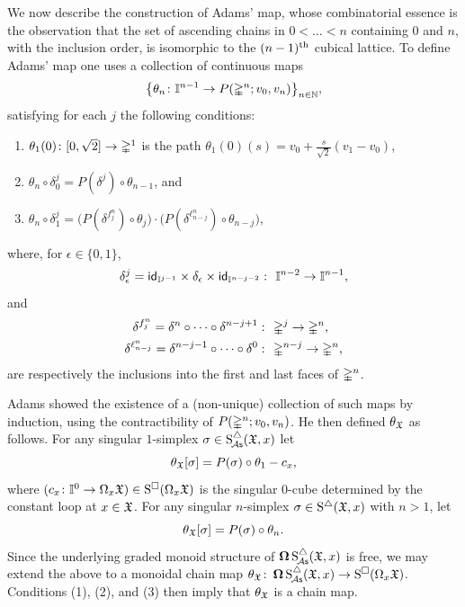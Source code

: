 We now describe the construction of Adams' map, whose combinatorial essence is the observation that the set of ascending chains in $0 < \dots < n$ containing $0$ and $n$, with the inclusion order, is isomorphic to the $(n-1)^\th$ cubical lattice.
To define Adams' map one uses a collection of continuous maps
\[
\set[\big]{\theta_n \colon \gcube^{n-1} \to P(\gsimplex^n;v_0,v_n)}_{n\in\N},
\]
satisfying for each $j$ the following conditions:
\begin{enumerate}
	\item $\theta_1(0)\colon [0,\sqrt{2}] \to \gsimplex^1$ is the path $\theta_1(0)(s) = v_0 + \frac{s}{\sqrt{2}}(v_1-v_0)$,
	\item $\theta_n \circ \delta_0^j = P(\delta^j) \circ \theta_{n-1}$, and
	\item $\theta_n \circ \delta_1^j =
	\big(P(\delta^{f^n_j}) \circ \theta_j\big) \cdot \big(P(\delta^{\ell^n_{n-j}}) \circ \theta_{n-j}\big)$,
\end{enumerate}
where, for $\epsilon \in \{0,1\}$,
\[
\delta_\epsilon^j = \id_{\gcube^{j-1}} \times \delta_\epsilon \times \id_{\gcube^{n-j-2}} \,\colon\ \gcube^{n-2} \to \gcube^{n-1},
\]
and
\[
\begin{split}
	\delta^{f^n_j} = \delta^n \circ \dotsb \circ \delta^{n-j+1} &\,\colon\ \gsimplex^j \to \gsimplex^n, \\
	\delta^{\ell^n_{n-j}} = \delta^{n-j-1} \circ \dotsb \circ \delta^{0} &\, \colon\ \gsimplex^{n-j} \to \gsimplex^n,
\end{split}
\]
are respectively the inclusions into the first and last faces of $\gsimplex^n$.

Adams showed the existence of a (non-unique) collection of such maps by induction, using the contractibility of $P(\gsimplex^n;v_0,v_n)$.
He then defined $\theta_{\fX}$ as follows.
For any singular $1$-simplex $\sigma \in \sSchainsA(\fX,x)$ let
\[
\theta_{\fX}[\sigma] = P(\sigma) \circ \theta_1 - c_x,
\]
where $(c_x \colon \gcube^0 \to \loops_x \fX) \in \cSchains(\loops_x \fX)$ is the singular $0$-cube determined by the constant loop at $x \in \fX$.
For any singular $n$-simplex $\sigma \in \sSchains(\fX,x)$ with $n>1$, let
\[
\theta_{\fX}[\sigma] = P(\sigma) \circ \theta_n.
\]
Since the underlying graded monoid structure of $\cobar \sSchainsA(\fX,x)$ is free, we may extend the above to a monoidal chain map $\theta_{\fX} \colon \cobar \sSchainsA(\fX,x) \to \cSchains(\loops_x \fX)$.
Conditions (1), (2), and (3) then imply that $\theta_{\fX}$ is a chain map.

